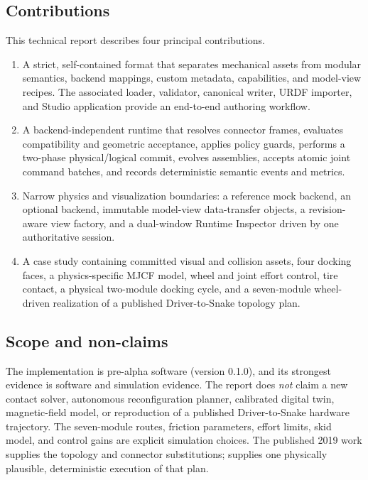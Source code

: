 \subsection{Contributions}

This technical report describes four principal contributions.

\begin{enumerate}
  \item A strict, self-contained \robotpack{} format that separates mechanical assets
        from modular semantics, backend mappings, custom metadata, capabilities, and
        model-view recipes. The associated loader, validator, canonical writer, URDF
        importer, and Studio application provide an end-to-end authoring workflow.
  \item A backend-independent runtime that resolves connector frames, evaluates
        compatibility and geometric acceptance, applies policy guards, performs a
        two-phase physical/logical commit, evolves assemblies, accepts atomic joint
        command batches, and records deterministic semantic events and metrics.
  \item Narrow physics and visualization boundaries: a reference mock backend, an
        optional \mujoco{} backend, immutable model-view data-transfer objects, a
        revision-aware view factory, and a dual-window Runtime Inspector driven by one
        authoritative session.
  \item A \smoresep{} case study containing committed visual and collision assets,
        four docking faces, a physics-specific MJCF model, wheel and joint effort
        control, tire contact, a physical two-module docking cycle, and a seven-module
        wheel-driven realization of a published Driver-to-Snake topology plan.
\end{enumerate}

\subsection{Scope and non-claims}

The implementation is pre-alpha software (version 0.1.0), and its strongest evidence
is software and simulation evidence. The report does \emph{not} claim a new contact
solver, autonomous reconfiguration planner, calibrated \smoresep{} digital twin,
magnetic-field model, or reproduction of a published Driver-to-Snake hardware
trajectory. The seven-module routes, friction parameters, effort limits, skid model,
and control gains are explicit simulation choices. The published 2019 work supplies
the topology and connector substitutions; \modsim{} supplies one physically plausible,
deterministic execution of that plan.

